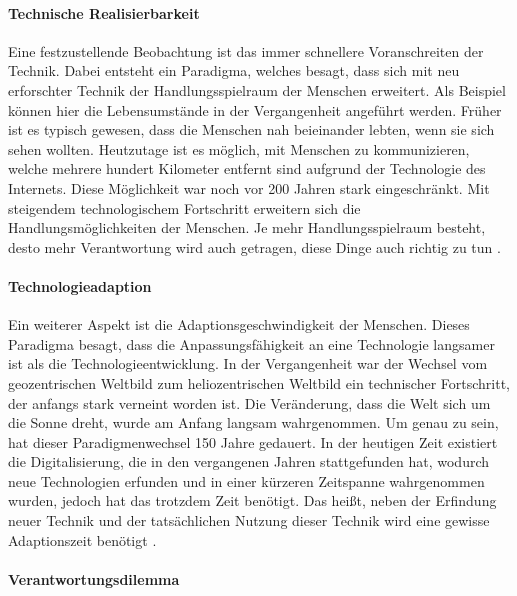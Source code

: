 \documentclass[11pt]{article}
\begin{document}
\paragraph{Technische Realisierbarkeit}
Eine festzustellende Beobachtung ist das immer schnellere Voranschreiten der Technik. Dabei entsteht ein Paradigma, welches besagt, dass sich mit neu erforschter Technik der Handlungsspielraum der Menschen erweitert. Als Beispiel können hier die Lebensumstände in der Vergangenheit angeführt werden. Früher ist es typisch gewesen, dass die Menschen nah beieinander lebten, wenn sie sich sehen wollten. Heutzutage ist es möglich, mit Menschen zu kommunizieren, welche mehrere hundert Kilometer entfernt sind aufgrund der Technologie des Internets. Diese Möglichkeit war noch vor 200 Jahren stark eingeschränkt. Mit steigendem technologischem Fortschritt erweitern sich die Handlungsmöglichkeiten der Menschen. Je mehr Handlungsspielraum besteht, desto mehr Verantwortung wird auch getragen, diese Dinge auch richtig zu tun \cite{article}.

\paragraph{Technologieadaption}
Ein weiterer Aspekt ist die Adaptionsgeschwindigkeit der Menschen. Dieses Paradigma besagt, dass die Anpassungsfähigkeit an eine Technologie langsamer ist als die Technologieentwicklung. In der Vergangenheit war der Wechsel vom geozentrischen Weltbild zum heliozentrischen Weltbild ein technischer Fortschritt, der anfangs stark verneint worden ist. Die Veränderung, dass die Welt sich um die Sonne dreht, wurde am Anfang langsam wahrgenommen. Um genau zu sein, hat dieser Paradigmenwechsel 150 Jahre gedauert. In der heutigen Zeit existiert die Digitalisierung, die in den vergangenen Jahren stattgefunden hat, wodurch neue Technologien erfunden und in einer kürzeren Zeitspanne wahrgenommen wurden, jedoch hat das trotzdem Zeit benötigt. Das heißt, neben der Erfindung neuer Technik und der tatsächlichen Nutzung dieser Technik wird eine gewisse Adaptionszeit benötigt \cite{article}. 

\paragraph{Verantwortungsdilemma}
\end{document}
